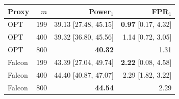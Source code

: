 \begin{tabular}{@{}lrrr@{}}
\toprule
Proxy & $m$ & Power$_1$ & FPR$_1$ \\
\midrule
OPT & 199 & 39.13 [27.48, 45.15] & \textbf{0.97} [0.17, 4.32] \\
OPT & 400 & 39.32 [36.80, 45.56] & 1.14 [0.72, 3.05] \\
OPT & 800 & \textbf{40.32} & 1.31 \\
Falcon & 199 & 43.39 [27.04, 49.74] & \textbf{2.22} [0.08, 4.58] \\
Falcon & 400 & 44.40 [40.87, 47.07] & 2.29 [1.82, 3.22] \\
Falcon & 800 & \textbf{44.54} & 2.29 \\
\bottomrule
\end{tabular}
